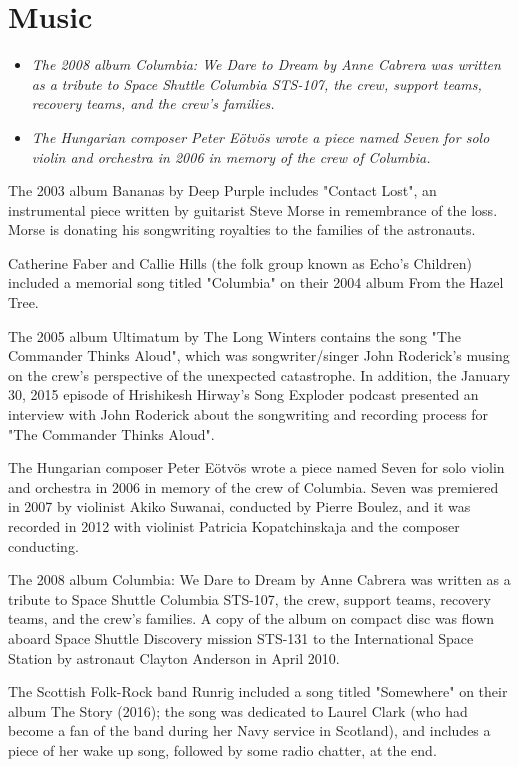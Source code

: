 \section{Music}\label{music}

\begin{itemize}
\item
  \emph{The 2008 album Columbia: We Dare to Dream by Anne Cabrera was
  written as a tribute to Space Shuttle Columbia STS-107, the crew,
  support teams, recovery teams, and the crew's families.}
\item
  \emph{The Hungarian composer Peter Eötvös wrote a piece named Seven
  for solo violin and orchestra in 2006 in memory of the crew of
  Columbia.}
\end{itemize}

The 2003 album Bananas by Deep Purple includes "Contact Lost", an
instrumental piece written by guitarist Steve Morse in remembrance of
the loss. Morse is donating his songwriting royalties to the families of
the astronauts.

Catherine Faber and Callie Hills (the folk group known as Echo's
Children) included a memorial song titled "Columbia" on their 2004 album
From the Hazel Tree.

The 2005 album Ultimatum by The Long Winters contains the song "The
Commander Thinks Aloud", which was songwriter/singer John Roderick's
musing on the crew's perspective of the unexpected catastrophe. In
addition, the January 30, 2015 episode of Hrishikesh Hirway's Song
Exploder podcast presented an interview with John Roderick about the
songwriting and recording process for "The Commander Thinks Aloud".

The Hungarian composer Peter Eötvös wrote a piece named Seven for solo
violin and orchestra in 2006 in memory of the crew of Columbia. Seven
was premiered in 2007 by violinist Akiko Suwanai, conducted by Pierre
Boulez, and it was recorded in 2012 with violinist Patricia
Kopatchinskaja and the composer conducting.

The 2008 album Columbia: We Dare to Dream by Anne Cabrera was written as
a tribute to Space Shuttle Columbia STS-107, the crew, support teams,
recovery teams, and the crew's families. A copy of the album on compact
disc was flown aboard Space Shuttle Discovery mission STS-131 to the
International Space Station by astronaut Clayton Anderson in April 2010.

The Scottish Folk-Rock band Runrig included a song titled "Somewhere" on
their album The Story (2016); the song was dedicated to Laurel Clark
(who had become a fan of the band during her Navy service in Scotland),
and includes a piece of her wake up song, followed by some radio
chatter, at the end.

